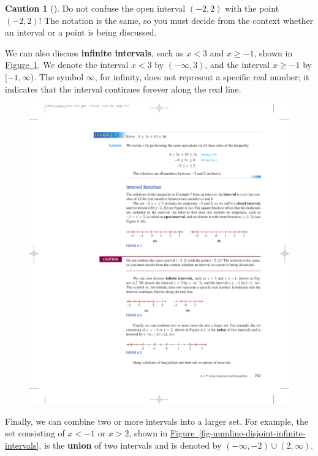 \documentclass[10pt,]{book}
\newcommand{\terminology}[1]{\textbf{#1}}
\theoremstyle{plain}
\theoremstyle{definition}
\newtheorem{warning}[theorem]{Caution}
\theoremstyle{definition}
\theoremstyle{definition}
\numberwithin{equation}{part}
\newcommand{\lt}{<}
\newcommand{\gt}{>}
\begin{document}
%
\begin{warning}[]\label{warning-2}
Do not confuse the open interval \((−2, 2)\) with the point \((−2, 2)\)! The notation is the same, so you must decide from the context whether an interval or a point is being discussed.%
\end{warning}
\par
We can also discuss \terminology{infinite intervals}, such as \(x\lt 3\) and \(x\ge -1\), shown in \hyperref[fig-numline-infinite-intervals]{Figure~\ref{fig-numline-infinite-intervals}}. We denote the interval \(x\lt 3\) by \((−\infty, 3)\), and the interval \(x\ge -1\) by \([−1, \infty)\). The symbol \(\infty\), for infinity, does not represent a specific real number; it indicates that the interval continues forever along the real line. \leavevmode%
\begin{figure}
\centering
\includegraphics[width=1\linewidth]{images/fig-numline-infinite-intervals}
\caption{\label{fig-numline-infinite-intervals}}
\end{figure}
%
\par
Finally, we can combine two or more intervals into a larger set. For example, the set consisting of \(x\lt -1\) or \(x\gt 2\), shown in \hyperref[fig-numline-disjoint-infinite-intervals]{Figure~\ref{fig-numline-disjoint-infinite-intervals}}, is the \terminology{union} of two intervals and is denoted by \((−\infty,−2) \cup (2,\infty)\). \leavevmode%
\end{document}
